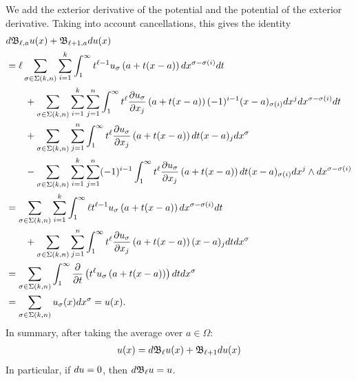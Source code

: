 \documentclass[12pt,a4paper]{article}
\begin{document}
We add the exterior derivative of the potential and the potential of the exterior derivative.
Taking into account cancellations, this gives the identity 
\begin{align*}
    &
    d {\mathfrak B}_{\ell,a} u(x)
    +
    {\mathfrak B}_{\ell+1,a} d u(x)
    \\&
    =
    \ell
    \sum_{\sigma \in \Sigma(k,n)} \sum_{i=1}^{k}
    \int_{1}^\infty 
    t^{\ell-1} u_{\sigma}\left(a+t(x-a)\right) dx^{\sigma-\sigma(i)} dt 
    \\&\qquad
    + 
    \sum_{\sigma \in \Sigma(k,n)} \sum_{i=1}^{k} \sum_{j=1}^{n}
    \int_{1}^\infty 
    t^{\ell} \frac{ \partial u_{\sigma} }{\partial x_{j}}\left(a+t(x-a)\right) (-1)^{i-1} (x-a)_{\sigma(i) } dx^{j} dx^{\sigma-\sigma(i)} dt 
    \\&\qquad
    +
    \sum_{\sigma \in \Sigma(k,n)} \sum_{j=1}^{n}
    \int_{1}^\infty t^{\ell} \frac{ \partial u_{\sigma} }{\partial x_{j}}\left(a+t(x-a)\right) dt (x-a)_{j}
    dx^{\sigma}
    \\&\qquad
    - 
    \sum_{\sigma \in \Sigma(k,n)} \sum_{i=1}^{k} \sum_{j=1}^{n}
    (-1)^{i-1}
    \int_{1}^\infty t^{\ell} \frac{ \partial u_{\sigma} }{\partial x_{j}}\left(a+t(x-a)\right) dt 
    (x-a)_{\sigma(i)} dx^{j} \wedge dx^{\sigma-\sigma(i)}
    \\&
    =
    \sum_{\sigma \in \Sigma(k,n)} \sum_{i=1}^{k}
    \int_{1}^\infty 
    \ell t^{\ell-1} u_{\sigma}\left(a+t(x-a)\right) dx^{\sigma-\sigma(i)} dt 
    \\&\qquad
    +
    \sum_{\sigma \in \Sigma(k,n)} \sum_{j=1}^{n}
    \int_{1}^\infty t^{\ell} \frac{ \partial u_{\sigma} }{\partial x_{j}}\left(a+t(x-a)\right) (x-a)_{j} dt
    dx^{\sigma}
    \\&
    =
    \sum_{\sigma \in \Sigma(k,n)} 
    \int_{1}^\infty \frac{\partial}{\partial t} \left( t^{\ell} u_{\sigma}\left(a+t(x-a)\right) \right) dt dx^{\sigma}
    \\&
    =
    \sum_{\sigma \in \Sigma(k,n)} 
    u_{\sigma}(x) dx^{\sigma}
    =
    u(x)
    .
\end{align*}
In summary, after taking the average over $a \in \Omega$:
\begin{align*}
    u(x) = d {\mathfrak B}_{\ell} u(x) + {\mathfrak B}_{\ell+1} d u(x)
\end{align*}
In particular, if $d u = 0$, then $d {\mathfrak B}_{\ell} u = u$.
\\
\end{document}
